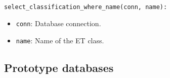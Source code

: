 \documentclass[pdf,sprung,slideColor,nocolorBG]{beamer}
\newenvironment{colortheme}[1]{
\def\ProvidesPackageRCS $##1${\relax}
\renewcommand{\ProcessOptions}{\relax}
\makeatletter

\makeatother
}{}
\begin{document}
\begin{colortheme}{jubata}
\begin{frame}[fragile]
~

\begin{verbatim}
select_classification_where_name(conn, name):
\end{verbatim}
\begin{itemize}
 \item \texttt{conn}: Database connection.
 \item \texttt{name}: Name of the ET class.
\end{itemize}

\end{frame}

\end{colortheme}

\subsection{Prototype databases}
\end{document}

